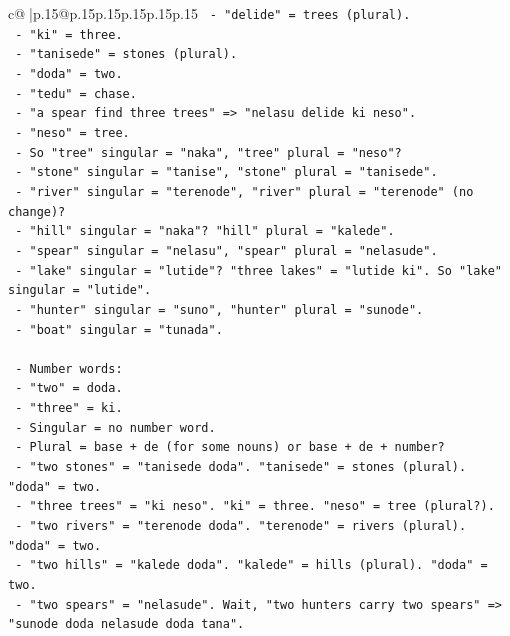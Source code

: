 \documentclass{article}
\begin{document}
{\begin{supertabular}{c@{$\;$}|p{.15\linewidth}@{}p{.15\linewidth}p{.15\linewidth}p{.15\linewidth}p{.15\linewidth}p{.15\linewidth}}
{{{\texttt{       {-} "delide" = trees (plural).} \\
\texttt{       {-} "ki" = three.} \\
\texttt{       {-} "tanisede" = stones (plural).} \\
\texttt{       {-} "doda" = two.} \\
\texttt{       {-} "tedu" = chase.} \\
\texttt{     {-} "a spear find three trees" => "nelasu delide ki neso".} \\
\texttt{       {-} "neso" = tree.} \\
\texttt{     {-} So "tree" singular = "naka", "tree" plural = "neso"?} \\
\texttt{     {-} "stone" singular = "tanise", "stone" plural = "tanisede".} \\
\texttt{     {-} "river" singular = "terenode", "river" plural = "terenode" (no change)?} \\
\texttt{     {-} "hill" singular = "naka"? "hill" plural = "kalede".} \\
\texttt{     {-} "spear" singular = "nelasu", "spear" plural = "nelasude".} \\
\texttt{     {-} "lake" singular = "lutide"? "three lakes" = "lutide ki". So "lake" singular = "lutide".} \\
\texttt{     {-} "hunter" singular = "suno", "hunter" plural = "sunode".} \\
\texttt{     {-} "boat" singular = "tunada".} \\
\\ 
\texttt{   {-} Number words:} \\
\texttt{     {-} "two" = doda.} \\
\texttt{     {-} "three" = ki.} \\
\texttt{     {-} Singular = no number word.} \\
\texttt{     {-} Plural = base + de (for some nouns) or base + de + number?} \\
\texttt{     {-} "two stones" = "tanisede doda". "tanisede" = stones (plural). "doda" = two.} \\
\texttt{     {-} "three trees" = "ki neso". "ki" = three. "neso" = tree (plural?).} \\
\texttt{     {-} "two rivers" = "terenode doda". "terenode" = rivers (plural). "doda" = two.} \\
\texttt{     {-} "two hills" = "kalede doda". "kalede" = hills (plural). "doda" = two.} \\
\texttt{     {-} "two spears" = "nelasude". Wait, "two hunters carry two spears" => "sunode doda nelasude doda tana".} \\
}}}
\end{supertabular}}
\end{document}

